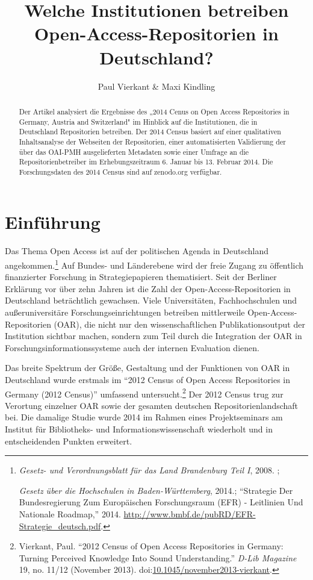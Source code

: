 \documentclass[a4paper,
fontsize=11pt,
oneside,
numbers=noperiodatend,
parskip=half-,
bibliography=totoc,
final
]{scrartcl}
\title{\LARGE{Welche Institutionen betreiben Open-Access-Repositorien in Deutschland?}} %
\author{Paul Vierkant \& Maxi Kindling} %
\date{}
\begin{document}
\maketitle
\thispagestyle{fancyplain} 



\begin{abstract}
Der Artikel analysiert die Ergebnisse des „2014 Cenus on Open Access
Repositories in Germany, Austria and Switzerland" im Hinblick auf die
Institutionen, die in Deutschland Repo\-si\-torien betreiben. Der 2014
Census basiert auf einer qualitativen Inhaltsanalyse der Webseiten der
Repositorien, einer automatisierten Validierung der über das OAI-PMH
ausgelieferten Metadaten sowie einer Umfrage an die
Repositorienbetreiber im Erhebungszeitraum 6. Januar bis 13. Februar
2014. Die Forschungsdaten des 2014 Census sind auf zenodo.org verfügbar.
\end{abstract}


\section*{Einführung}\label{einfuxfchrung}

Das Thema Open Access ist auf der politischen Agenda in Deutschland
angekommen.\footnote{\emph{Gesetz- und Verordnungsblatt für das Land
  Brandenburg Teil I}, 2008. ;

  \emph{Gesetz über die Hochschulen in Baden-Württemberg}, 2014.;
  \enquote{Strategie Der Bundesregierung Zum Europäischen Forschungsraum
  (EFR) - Leitlinien Und Nationale Roadmap,} 2014.
  \url{http://www.bmbf.de/pubRD/EFR-Strategie_deutsch.pdf}.} Auf Bundes-
und Länderebene wird der freie Zugang zu öffentlich finanzierter
Forschung in Strategiepapieren thematisiert. Seit der Berliner Erklärung
vor über zehn Jahren ist die Zahl der Open-Access-Repo\-si\-torien in
Deutschland beträchtlich gewachsen. Viele Universitäten, Fachhochschulen
und außeruniversitäre Forschungseinrichtungen betreiben mittlerweile
Open-Ac\-cess-Repositorien (OAR), die nicht nur den wissenschaftlichen
Publikationsoutput der Institution sichtbar machen, sondern zum Teil
durch die Integration der OAR in Forschungsinformationssysteme auch der
internen Evaluation dienen.

Das breite Spektrum der Größe, Gestaltung und der Funktionen von OAR in
Deutschland wurde erstmals im \enquote{2012 Census of Open Access
Repositories in Germany (2012 Census)} umfassend untersucht.\footnote{Vierkant,
  Paul. \enquote{2012 Census of Open Access Repositories in Germany:
  Turning Perceived Knowledge Into Sound Understanding.} \emph{D-Lib
  Magazine} 19, no. 11/12 (November 2013).
  doi:\href{http:doi.org/10.1045/november2013-vierkant}{10.1045/november2013-vierkant}.}
Der 2012 Census trug zur Verortung einzelner OAR sowie der gesamten
deutschen Repositorienlandschaft bei. Die damalige Studie wurde 2014 im
Rahmen eines Projektseminars am Institut für Bibliotheks- und
Informationswissenschaft wiederholt und in entscheidenden Punkten
erweitert.
\end{document}
